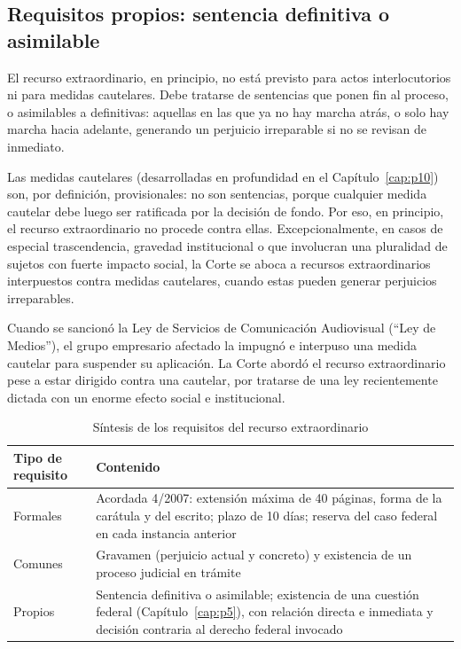 \documentclass[12pt,oneside]{book}
\begin{document}
\subsection{Requisitos propios: sentencia definitiva o asimilable}

\begin{defbox}
El recurso extraordinario, en principio, no está previsto para actos
interlocutorios ni para medidas cautelares. Debe tratarse de sentencias que ponen
fin al proceso, o asimilables a definitivas: aquellas en las que ya no hay marcha
atrás, o solo hay marcha hacia adelante, generando un perjuicio irreparable si no
se revisan de inmediato.
\end{defbox}

Las medidas cautelares (desarrolladas en profundidad en el Capítulo~\ref{cap:p10})
son, por definición, provisionales: no son sentencias, porque cualquier medida
cautelar debe luego ser ratificada por la decisión de fondo. Por eso, en
principio, el recurso extraordinario no procede contra ellas. Excepcionalmente, en
casos de especial trascendencia, gravedad institucional o que involucran una
pluralidad de sujetos con fuerte impacto social, la Corte se aboca a recursos
extraordinarios interpuestos contra medidas cautelares, cuando estas pueden
generar perjuicios irreparables.

\begin{exbox}
Cuando se sancionó la Ley de Servicios de Comunicación Audiovisual (``Ley de
Medios''), el grupo empresario afectado la impugnó e interpuso una medida cautelar
para suspender su aplicación. La Corte abordó el recurso extraordinario pese a
estar dirigido contra una cautelar, por tratarse de una ley recientemente dictada
con un enorme efecto social e institucional.
\end{exbox}

\begin{table}[H]
\centering
\caption{Síntesis de los requisitos del recurso extraordinario}
\begin{tabularx}{\textwidth}{@{}lX@{}}
\toprule
\textbf{Tipo de requisito} & \textbf{Contenido} \\
\midrule
Formales & Acordada 4/2007: extensión máxima de 40 páginas, forma de la carátula
y del escrito; plazo de 10 días; reserva del caso federal en cada instancia
anterior \\
Comunes & Gravamen (perjuicio actual y concreto) y existencia de un proceso
judicial en trámite \\
Propios & Sentencia definitiva o asimilable; existencia de una cuestión federal
(Capítulo~\ref{cap:p5}), con relación directa e inmediata y decisión contraria al
derecho federal invocado \\
\bottomrule
\end{tabularx}
\end{table}
\end{document}
